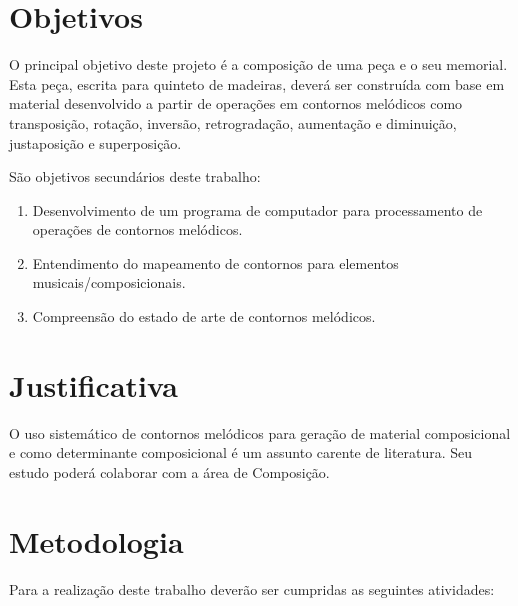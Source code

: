 \documentclass{article}
\begin{document}
\section{Objetivos}
\label{sec:objetivos}

O principal objetivo deste projeto é  a composição de uma peça e o seu
memorial.  Esta peça, escrita  para quinteto  de madeiras,  deverá ser
construída com base em material  desenvolvido a partir de operações em
contornos    melódicos   como    transposição,    rotação,   inversão,
retrogradação, aumentação e diminuição, justaposição e superposição.

São objetivos secundários deste trabalho:

\begin{enumerate}
\item Desenvolvimento de um programa de computador para processamento
  de operações de contornos melódicos.
\item Entendimento do mapeamento de contornos para elementos
  musicais/composicionais.
\item Compreensão do estado de arte de contornos melódicos.
\end{enumerate}

\section{Justificativa}
\label{sec:justificativa}

O uso sistemático de contornos melódicos para geração de material
composicional e como determinante composicional é um assunto carente
de literatura. Seu estudo poderá colaborar com a área de Composição.

\section{Metodologia}
\label{sec:metodologia}

Para a realização deste trabalho deverão ser cumpridas as seguintes
atividades:
\end{document}
